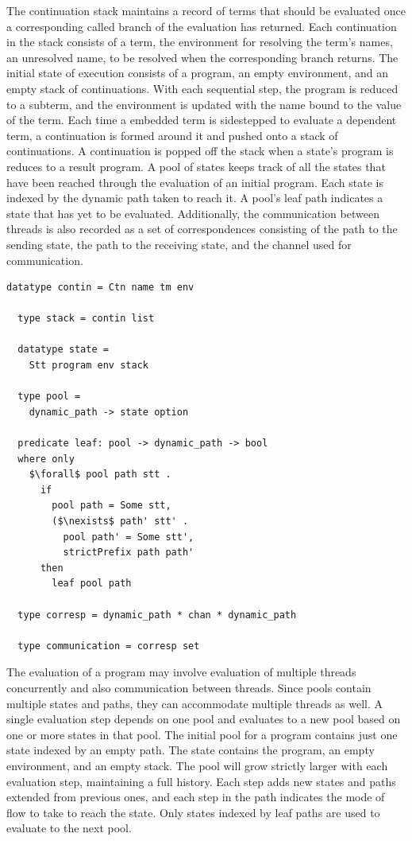 \documentclass[letterpaper, 11pt]{extarticle}
\begin{document}
The continuation stack maintains a record of terms that should be evaluated
once a corresponding called branch of the evaluation has returned.
Each continuation in the stack consists of a term, the environment for resolving the
term's names, an unresolved name, to be resolved when the corresponding branch returns. 
The initial state of execution consists of a program, an empty environment, and an empty stack
of continuations. With each sequential step, the program is reduced to a subterm,
and the environment is updated with the name bound to the value of the term. Each time a
embedded term is sidestepped to evaluate a dependent term, a continuation is formed around
it and pushed onto a stack of continuations. A continuation is popped off the stack when a
state's program is reduces to a result program.  A pool of states keeps track of all the states
that have been reached through the evaluation of an initial program.  Each state is indexed by
the dynamic path taken to reach it. A pool's leaf path indicates a state that has yet to be
evaluated. Additionally, the communication between threads is also recorded as a set of
correspondences consisting of the path to the sending state, the path to the receiving state,
and the channel used for communication.

\begin{lstlisting}[language=logic, mathescape]
  datatype contin = Ctn name tm env

  type stack = contin list

  datatype state =
    Stt program env stack 

  type pool =
    dynamic_path -> state option

  predicate leaf: pool -> dynamic_path -> bool
  where only
    $\forall$ pool path stt .
      if
        pool path = Some stt,
        ($\nexists$ path' stt' .
          pool path' = Some stt',
          strictPrefix path path'
      then
        leaf pool path

  type corresp = dynamic_path * chan * dynamic_path

  type communication = corresp set 
\end{lstlisting}

The evaluation of a program may involve evaluation of multiple threads concurrently and also
communication between threads. Since pools contain multiple states and paths, they can
accommodate multiple threads as well.  A single evaluation step depends on one pool and
evaluates to a new pool based on one or more states in that pool. The initial pool for a
program contains just one state indexed by an empty path. The state contains the program, an
empty environment, and an empty stack. The pool will grow strictly larger with each evaluation
step, maintaining a full history. Each step adds new states and paths extended from previous
ones, and each step in the path indicates the mode of flow to take to reach the state.
Only states indexed by leaf paths are used to evaluate to the next pool.
\end{document}
